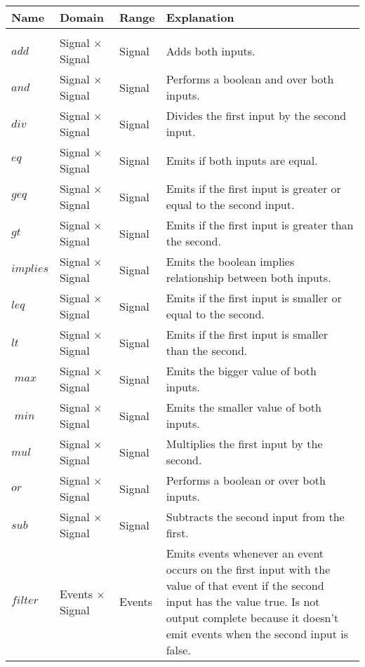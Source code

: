\begin{longtable}{lp{3cm}lp{6cm}}
  Name                 & Domain                    & Range   & Explanation \\
  \toprule \\
  \(\mathit{add}\)              & Signal \(\times\) Signal  & Signal  & Adds both inputs. \\
  \(\mathit{and}\)              & Signal \(\times\) Signal  & Signal  & Performs a boolean and over both inputs. \\
  \(\mathit{div}\)              & Signal \(\times\) Signal  & Signal  & Divides the first input by the second input. \\
  \(\mathit{eq}\)               & Signal \(\times\) Signal  & Signal  & Emits if both inputs are equal. \\
  \(\mathit{geq}\)              & Signal \(\times\) Signal  & Signal  & Emits if the first input is greater or equal to the second input. \\
  \(\mathit{gt}\)               & Signal \(\times\) Signal  & Signal  & Emits if the first input is greater than the second.\\
  \(\mathit{implies}\)          & Signal \(\times\) Signal  & Signal  & Emits the boolean implies relationship between both inputs.\\
  \(\mathit{leq}\)              & Signal \(\times\) Signal  & Signal  & Emits if the first input is smaller or equal to the second.\\
  \(\mathit{lt}\)               & Signal \(\times\) Signal  & Signal  & Emits if the first input is smaller than the second.\\
  \(\mathit{\max}\)              & Signal \(\times\) Signal  & Signal  & Emits the bigger value of both inputs. \\
  \(\mathit{\min}\)              & Signal \(\times\) Signal  & Signal  & Emits the smaller value of both inputs.\\
  \(\mathit{mul}\)              & Signal \(\times\) Signal  & Signal  & Multiplies the first input by the second.\\
  \(\mathit{or}\)               & Signal \(\times\) Signal  & Signal  & Performs a boolean or over both inputs.\\
  \(\mathit{sub}\)              & Signal \(\times\) Signal  & Signal  & Subtracts the second input from the first.\\
  \(\mathit{filter}\)           & Events \(\times\) Signal  & Events  & Emits events whenever an event occurs on the first input with the value of that event if the second input has the value true. Is not output complete because it doesn't emit events when the second input is false. \\

\end{longtable}
